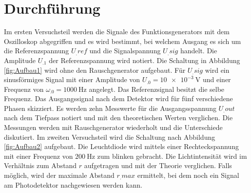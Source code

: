 
\section{Durchführung}
\label{sec:Durchführung}

Im ersten Versuchsteil werden die Signale des Funktionsgenerators mit dem Oszilloskop abgegriffen und es wird bestimmt, bei welchem Ausgang es sich um die Referenzspannung $U_.{ref}$ und die Signalspannung $U_.{sig}$ handelt. Die Amplitude $U_.1$ der Referenzspannung wird notiert.\newline
Die Schaltung in Abbildung \ref{fig:Aufbau1} wird ohne den Rauschgenerator aufgebaut. Für $U_.{sig}$ wird ein sinusförmiges Signal mit einer Amplitude von $U_.0=\SI{10e-3}{\volt}$ und einer Frequenz von $\omega_.0=\SI{1000}{\hertz}$ angelegt. Das Referenzsignal besitzt die selbe Frequenz.
Das Ausgangssignal nach dem Detektor wird für fünf verschiedene Phasen skizziert. Es werden zehn Messwerte für die Ausgangsspannung $U_.{out}$ nach dem Tiefpass notiert und mit den theoretischen Werten verglichen.
Die Messungen werden mit Rauschgenerator wiederholt und die Unterschiede diskutiert.\newline
Im zweiten Versuchsteil wird die Schaltung nach Abbildung \ref{fig:Aufbau2} aufgebaut. Die Leuchtdiode wird mittels einer Rechteckspannung mit einer Frequenz von $\SI{200}{\hertz}$ zum blinken gebracht. Die Lichtintensität wird im Verhältnis zum Abstand $r$ aufgetragen und mit der Theorie verglichen. Falls möglich, wird der maximale Abstand $r_.{max}$ ermittelt, bei dem noch ein Signal am Photodetektor nachgewiesen werden kann.        